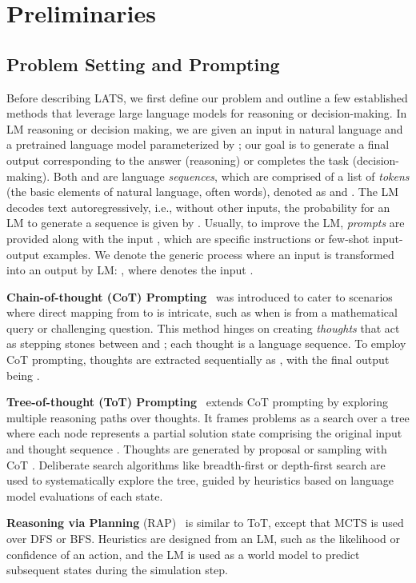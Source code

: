 \documentclass{article} \usepackage{iclr2024_conference,times}
\begin{document}
\section{Preliminaries}

\subsection{Problem Setting and Prompting}

Before describing LATS, we first define our problem and outline a few established methods that leverage large language models for reasoning or decision-making. In LM reasoning or decision making, we are given an input  in natural language and a pretrained language model  parameterized by ; our goal is to generate a final output  corresponding to the answer (reasoning) or completes the task (decision-making). Both  and  are language \textit{sequences}, which are comprised of a list of \textit{tokens} (the basic elements of natural language, often words), denoted as  and . The LM decodes text autoregressively, i.e., without other inputs, the probability for an LM to generate a sequence  is given by . Usually, to improve the LM, \textit{prompts} are provided along with the input , which are specific instructions or few-shot input-output examples. We denote the generic process where an input  is transformed into an output  by LM: , where  denotes the input .

\textbf{Chain-of-thought (CoT) Prompting}~\citep{wei2022chain} was introduced to cater to scenarios where direct mapping from  to  is intricate, such as when  is from a mathematical query or challenging question. This method hinges on creating \textit{thoughts}  that act as stepping stones between  and ; each thought  is a language sequence. To employ CoT prompting, thoughts are extracted sequentially as , with the final output being . 

\textbf{Tree-of-thought (ToT) Prompting}~\citep{yao2023tree} extends CoT prompting by exploring multiple reasoning paths over thoughts. It frames problems as a search over a tree where each node  represents a partial solution state comprising the original input  and thought sequence . Thoughts  are generated by proposal or sampling with CoT . Deliberate search algorithms like breadth-first or depth-first search are used to systematically explore the tree, guided by heuristics based on language model evaluations  of each state. 

\textbf{Reasoning via Planning} (RAP)~\citep{hao2023reasoning} is similar to ToT, except that MCTS is used over DFS or BFS. Heuristics are designed from an LM, such as the likelihood or confidence of an action, and the LM is used as a world model to predict subsequent states during the simulation step.
\end{document}
